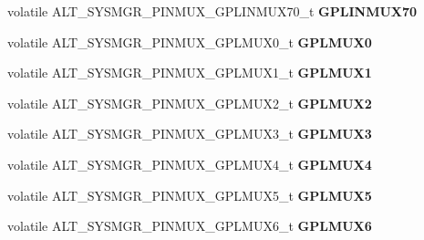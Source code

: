 \begin{DoxyCompactItemize}
volatile A\+L\+T\+\_\+\+S\+Y\+S\+M\+G\+R\+\_\+\+P\+I\+N\+M\+U\+X\+\_\+\+G\+P\+L\+I\+N\+M\+U\+X70\+\_\+t {\bfseries G\+P\+L\+I\+N\+M\+U\+X70}
\item 
\mbox{\label{structALT__SYSMGR__PINMUX__s_a722a41b168f02ccad2c8b28396a09ae1}} 
volatile A\+L\+T\+\_\+\+S\+Y\+S\+M\+G\+R\+\_\+\+P\+I\+N\+M\+U\+X\+\_\+\+G\+P\+L\+M\+U\+X0\+\_\+t {\bfseries G\+P\+L\+M\+U\+X0}
\item 
\mbox{\label{structALT__SYSMGR__PINMUX__s_a47e01d49fc849fe6f1cebcbe200a2f6e}} 
volatile A\+L\+T\+\_\+\+S\+Y\+S\+M\+G\+R\+\_\+\+P\+I\+N\+M\+U\+X\+\_\+\+G\+P\+L\+M\+U\+X1\+\_\+t {\bfseries G\+P\+L\+M\+U\+X1}
\item 
\mbox{\label{structALT__SYSMGR__PINMUX__s_a87d4283ab10ede24d79b450bca1e966f}} 
volatile A\+L\+T\+\_\+\+S\+Y\+S\+M\+G\+R\+\_\+\+P\+I\+N\+M\+U\+X\+\_\+\+G\+P\+L\+M\+U\+X2\+\_\+t {\bfseries G\+P\+L\+M\+U\+X2}
\item 
\mbox{\label{structALT__SYSMGR__PINMUX__s_a94ef47f3b491ec9b08a7e5a2fd7c05b5}} 
volatile A\+L\+T\+\_\+\+S\+Y\+S\+M\+G\+R\+\_\+\+P\+I\+N\+M\+U\+X\+\_\+\+G\+P\+L\+M\+U\+X3\+\_\+t {\bfseries G\+P\+L\+M\+U\+X3}
\item 
\mbox{\label{structALT__SYSMGR__PINMUX__s_ad591719434e254f39e2867c044f486e1}} 
volatile A\+L\+T\+\_\+\+S\+Y\+S\+M\+G\+R\+\_\+\+P\+I\+N\+M\+U\+X\+\_\+\+G\+P\+L\+M\+U\+X4\+\_\+t {\bfseries G\+P\+L\+M\+U\+X4}
\item 
\mbox{\label{structALT__SYSMGR__PINMUX__s_aa351d511c23fd7ae5970009795dfef58}} 
volatile A\+L\+T\+\_\+\+S\+Y\+S\+M\+G\+R\+\_\+\+P\+I\+N\+M\+U\+X\+\_\+\+G\+P\+L\+M\+U\+X5\+\_\+t {\bfseries G\+P\+L\+M\+U\+X5}
\item 
\mbox{\label{structALT__SYSMGR__PINMUX__s_a63e8864f40624777c1ae20669212746b}} 
volatile A\+L\+T\+\_\+\+S\+Y\+S\+M\+G\+R\+\_\+\+P\+I\+N\+M\+U\+X\+\_\+\+G\+P\+L\+M\+U\+X6\+\_\+t {\bfseries G\+P\+L\+M\+U\+X6}
\item 
\mbox{\label{structALT__SYSMGR__PINMUX__s_a14181a746c208d3c9967773a6857c876}} 

\end{DoxyCompactItemize}
